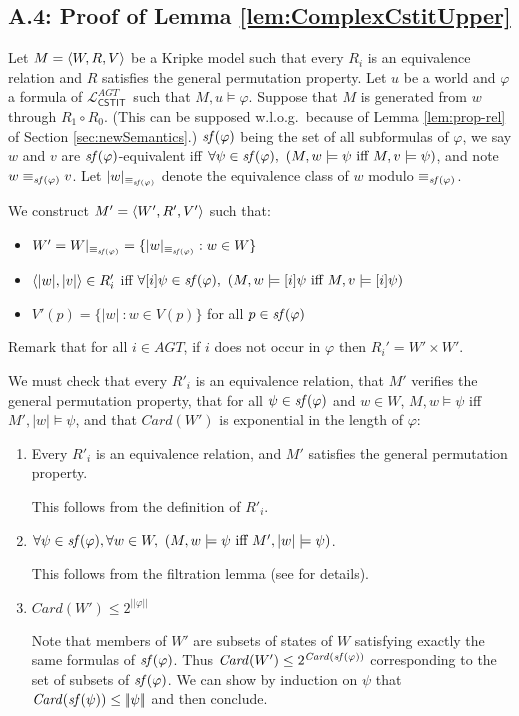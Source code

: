 \documentclass{article}
\renewcommand{\phi}{\varphi}
\newcommand{\card}[1]{\mathit{Card}(#1)}           \newcommand{\ext}[1]{|#1|}
\newcommand{\lngth}[1]{|\!|#1|\!|}
\newcommand{\cstit}[1]{[{#1}]}           \newcommand{\poscstit}[1]{\langle {#1} \rangle}    \newcommand{\dstit}[2]{[{#1}\ \mathit{dstit}\! :{#2}]}
\newcommand{\agtset}{\ensuremath{\mathit{AGT}}}
\newcommand{\LCSTIT}{$\mathcal{L}_{\mathsf{CSTIT}}^\agtset$}
\begin{document}
\subsection*{A.4: Proof of Lemma \ref{lem:ComplexCstitUpper}}

Let  $M = \langle W,R,V \rangle$ be a Kripke model such that
every $R_i$ is an equivalence relation and
$R$ satisfies the general permutation property.
Let $u$ be a world and $\phi$ a formula of \LCSTIT\ such that
$M,u\models\phi$.
Suppose that $M$ is generated from $w$ through $R_1 \circ R_0$.
(This can be supposed w.l.o.g.\ because of Lemma \ref{lem:prop-rel}
of Section \ref{sec:newSemantics}.)
$\subfml(\phi)$ being the set of all subformulas of $\phi$,
we say $w$ and $v$ are $\subfml(\phi)$-equivalent iff
$\forall \psi \in \subfml(\phi),\ (M,w\models\psi \mbox{ iff }
M,v \models\psi )$, and note $w \equiv_{\subfml(\phi)} v$.
Let $\ext{w}_{\equiv_{\subfml(\phi)}} $ denote
the equivalence class of $w$ modulo $\equiv_{\subfml(\phi)}$.

We construct $M' = \langle W',R',V' \rangle$ such that:
\begin{itemize}
\item $W' = W|_{\equiv_{\subfml(\phi)}}
          = \{ \ext{w}_{\equiv_{\subfml(\phi)}} : w \in W \}$
\item $\tuple{\ext{w},\ext{v}} \in R'_i $        iff
      $\forall \cstit{i}\psi \in \subfml(\phi),\
       (M,w \models\cstit{i}\psi \mbox{ iff } M,v\models\cstit{i}\psi)$
\item $V'(p) = \{\ext{w}\ : w \in V(p) \}$ for all $p \in \subfml(\phi)$
\end{itemize}
Remark that for all $i \in \agtset$,
if $i$ does not occur in $\phi$ then $R_i' = W' \times W' $.

We must check that every $R'_i$ is an equivalence relation,
that $M'$ verifies the general permutation property,
that for all $\psi \in \subfml(\phi)$ and $w \in W$,
$M,w \models \psi$ iff $M',\ext{w} \models \psi$, and
that $\card{W'}$ is exponential in the length of $\phi$:
\begin{enumerate}
\item Every $R'_i$ is an equivalence relation, and
$M'$ satisfies the general permutation property.

This follows from the definition of $R'_i$.

\item $\forall \psi \in\subfml(\phi), \forall w\in W,\ (M,w\models \psi
\mbox{ iff } M',\ext{w}\models \psi)$.

This follows from the filtration lemma (see \cite{Blackburn:2001:ML} for details).


\item $\card{W'} \leq 2^{\lngth{\phi}}$

Note that members of $W'$ are subsets of states of $W$ satisfying
exactly the same formulas of $\subfml(\phi)$.
Thus $\card{W'} \leq 2^{\card{\subfml(\phi)}}$ corresponding to the set
of subsets of $\subfml(\phi)$.
We can show by induction on $\psi$ that $\card{\subfml(\psi)} \leq \lngth{\psi}$
and then conclude.

\end{enumerate}
\end{document}
